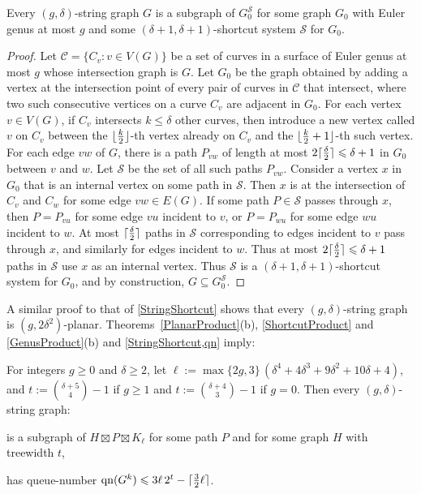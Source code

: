\documentclass{patmorin}
\DeclareMathOperator{\qn}{qn}
\DeclarePairedDelimiter{\ceil}{\lceil}{\rceil}
\DeclarePairedDelimiter{\floor}{\lfloor}{\rfloor}
\renewcommand{\SS}{\mathcal{S}}
\renewcommand{\geq}{\geqslant}
\renewcommand{\leq}{\leqslant}
\begin{document}
\begin{lem}
\label{StringShortcut}
Every $(g,\delta)$-string graph $G$ is a subgraph of $G_0^\SS$ for some graph $G_0$ with Euler genus at most $g$ and some $(\delta+1,\delta+1 )$-shortcut system $\SS$ for $G_0$.
\end{lem}

\begin{proof}
Let $\mathcal{C}=\{C_v:v\in V(G)\}$ be a set of curves in a surface of Euler genus at most $g$ whose intersection graph is $G$.  Let $G_0$ be the graph obtained by adding a vertex at the intersection point of every pair of curves in $\mathcal{C}$ that intersect,  where two such consecutive vertices on a curve $C_v$ are adjacent in $G_0$. For each vertex $v\in V(G)$, if $C_v$ intersects $k\leq\delta$ other curves, then introduce a new vertex called $v$ on $C_v$ between the
$\floor{\frac{k}{2}}$-th vertex already on $C_v$ and the $\floor{\frac{k}{2}+1}$-th such vertex. For each edge $vw$ of $G$, there is a path $P_{vw}$ of length at most $2\ceil{\frac{\delta}{2}}\leq \delta+1$ in $G_0$ between $v$ and $w$. Let $\SS$ be the set of all such paths $P_{vw}$. Consider a vertex $x$ in $G_0$ that is an internal vertex on some path in $\SS$. Then $x$ is at the intersection of $C_v$ and $C_w$ for some edge $vw\in E(G)$. If some path $P\in \SS$ passes through $x$, then $P=P_{vu}$ for some edge $vu$ incident to $v$, or $P=P_{wu}$ for some edge $wu$ incident to $w$. At most $\ceil{\frac{\delta}{2}}$ paths in $\SS$ corresponding to edges incident to $v$ pass through $x$, and similarly for edges incident to $w$. Thus at most $2\ceil{\frac{\delta}{2}}\leq\delta+1$ paths in $\SS$ use $x$ as an internal vertex. Thus $\SS$ is a $(\delta+1,\delta+1)$-shortcut system for $G_0$, and by construction, $G \subseteq G_0^\SS$.
\end{proof}

A similar proof to that of \cref{StringShortcut} shows that every $(g,\delta)$-string graph is $(g,2\delta^2)$-planar. Theorems~\ref{PlanarProduct}(b), \ref{ShortcutProduct}  and \ref{GenusProduct}(b) and \cref{StringShortcut,qn} imply:

\begin{thm}
\label{StringPartition}
For integers $g\geq 0$ and $\delta\geq 2$, let $\ell:= \max\{2g,3\} \,(\delta^4 + 4 \delta^3 + 9 \delta^2 + 10 \delta + 4)$,
and $t:= \binom{ \delta+5}{4}-1$ if $g\geq 1$ and $t:= \binom{ \delta+4}{3}-1$ if $g=0$.
Then  every $(g,\delta)$-string graph:
\begin{compactitem}
	\item is a subgraph of $H\boxtimes P \boxtimes K_{\ell}$ for some path $P$ and for some graph $H$ with treewidth $t$,
	\item has queue-number $\qn(G^k) \leq 3 \ell \, 2^t - \ceil{\tfrac{3}{2}\ell}$.
\end{compactitem}
\end{thm}
\end{document}
